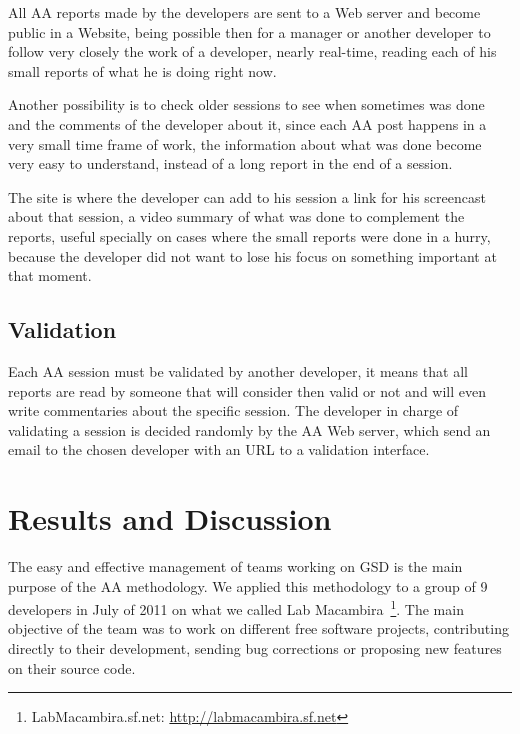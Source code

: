 \documentclass[letterpaper]{article}
\begin{document}
All AA reports made by the developers are sent to a Web server and become public
in a Website, being possible then for a manager or another developer to follow
very closely the work of a developer, nearly real-time, reading each of his
small reports of what he is doing right now.

Another possibility is to check older sessions to see when sometimes was done
and the comments of the developer about it, since each AA post happens in a very
small time frame of work, the information about what was done become very easy
to understand, instead of a long report in the end of a session.

The site is where the developer can add to his session a link for his screencast
about that session, a video summary of what was done to complement the reports,
useful specially on cases where the small reports were done in a hurry, because
the developer did not want to lose his focus on something important at that
moment.

\subsection{Validation}

Each AA session must be validated by another developer, it means that all
reports are read by someone that will consider then valid or not and will even
write commentaries about the specific session. The developer in charge of
validating a session is decided randomly by the AA Web server, which send an
email to the chosen developer with an URL to a validation interface.


\section{Results and Discussion}
\label{results}

The easy and effective management of teams working on GSD is the main purpose of
the AA methodology. We applied this methodology to a group of 9 developers in
July of 2011 on what we called Lab Macambira~\footnote{LabMacambira.sf.net:
  \url{http://labmacambira.sf.net}}. The main objective of the team was to work
on different free software projects, contributing directly to their development,
sending bug corrections or proposing new features on their source code.
\end{document}
